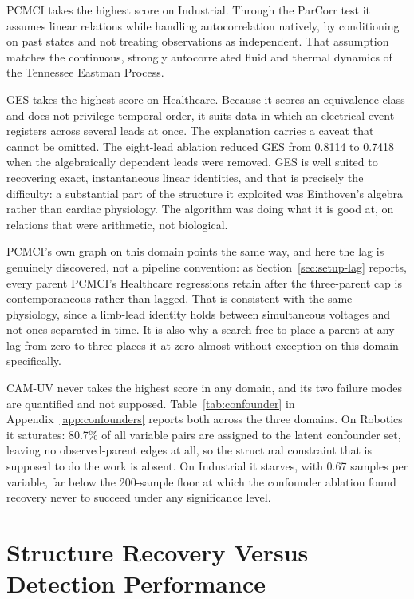 PCMCI takes the highest score on Industrial. Through the ParCorr test it assumes linear relations while handling autocorrelation natively, by conditioning on past states and not treating observations as independent. That assumption matches the continuous, strongly autocorrelated fluid and thermal dynamics of the Tennessee Eastman Process.

GES takes the highest score on Healthcare. Because it scores an equivalence class and does not privilege temporal order, it suits data in which an electrical event registers across several leads at once. The explanation carries a caveat that cannot be omitted. The eight-lead ablation reduced GES from 0.8114 to 0.7418 when the algebraically dependent leads were removed. GES is well suited to recovering exact, instantaneous linear identities, and that is precisely the difficulty: a substantial part of the structure it exploited was Einthoven's algebra rather than cardiac physiology. The algorithm was doing what it is good at, on relations that were arithmetic, not biological.

PCMCI's own graph on this domain points the same way, and here the lag is genuinely discovered, not a pipeline convention: as Section~\ref{sec:setup-lag} reports, every parent PCMCI's Healthcare regressions retain after the three-parent cap is contemporaneous rather than lagged. That is consistent with the same physiology, since a limb-lead identity holds between simultaneous voltages and not ones separated in time. It is also why a search free to place a parent at any lag from zero to three places it at zero almost without exception on this domain specifically.

CAM-UV never takes the highest score in any domain, and its two failure modes are quantified and not supposed. Table~\ref{tab:confounder} in Appendix~\ref{app:confounders} reports both across the three domains. On Robotics it saturates: 80.7\% of all variable pairs are assigned to the latent confounder set, leaving no observed-parent edges at all, so the structural constraint that is supposed to do the work is absent. On Industrial it starves, with 0.67 samples per variable, far below the 200-sample floor at which the confounder ablation found recovery never to succeed under any significance level.

\section{Structure Recovery Versus Detection Performance}
\label{sec:disc-structure}


